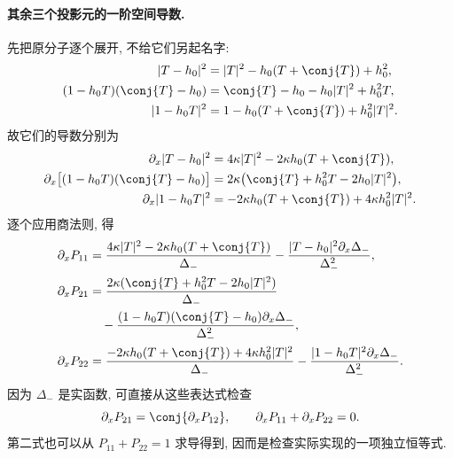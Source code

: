 \paragraph{其余三个投影元的一阶空间导数.}
先把原分子逐个展开, 不给它们另起名字:
\begin{align*}
|T-h_0|^2&=|T|^2-h_0(T+\conj{T})+h_0^2,\\
(1-h_0T)(\conj{T}-h_0)
&=\conj{T}-h_0-h_0|T|^2+h_0^2T,\\
|1-h_0T|^2&=1-h_0(T+\conj{T})+h_0^2|T|^2.
\end{align*}
故它们的导数分别为
\begin{align*}
\partial_x|T-h_0|^2
&=4\kappa|T|^2-2\kappa h_0(T+\conj{T}),\\
\partial_x\bigl[(1-h_0T)(\conj{T}-h_0)\bigr]
&=2\kappa\bigl(\conj{T}+h_0^2T-2h_0|T|^2\bigr),\\
\partial_x|1-h_0T|^2
&=-2\kappa h_0(T+\conj{T})+4\kappa h_0^2|T|^2.
\end{align*}
逐个应用商法则, 得
\begin{align*}
\partial_xP_{11}
&=\dfrac{4\kappa|T|^2-2\kappa h_0(T+\conj{T})}{\Delta_-}
-\dfrac{|T-h_0|^2\partial_x\Delta_-}{\Delta_-^2},\\
\partial_xP_{21}
&=\dfrac{2\kappa(\conj{T}+h_0^2T-2h_0|T|^2)}{\Delta_-}\\
&\quad-\dfrac{(1-h_0T)(\conj{T}-h_0)
\partial_x\Delta_-}{\Delta_-^2},\\
\partial_xP_{22}
&=\dfrac{-2\kappa h_0(T+\conj{T})+4\kappa h_0^2|T|^2}{\Delta_-}
-\dfrac{|1-h_0T|^2\partial_x\Delta_-}{\Delta_-^2}.
\end{align*}
因为 $\Delta_-$ 是实函数, 可直接从这些表达式检查
\[
\partial_xP_{21}=\conj{\partial_xP_{12}},
\qquad
\partial_xP_{11}+\partial_xP_{22}=0.
\]
第二式也可以从 $P_{11}+P_{22}=1$ 求导得到, 因而是检查实际实现的一项独立恒等式.

